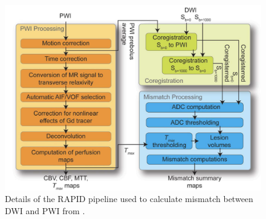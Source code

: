 \begin{frame}
\begin{columns}
    \begin{column}{0.42\textwidth}                 %
        \begin{figure}
            \centering
            \includegraphics[width=\linewidth]{figures/intro-straka.png}
            \caption{Details of the RAPID pipeline used to calculate mismatch between DWI and PWI from \cite{strakaRealTimeDiffusion2010}.}
            \label{fig:straka}
        \end{figure}
    \end{column}
    \end{columns}   %

\end{frame}

